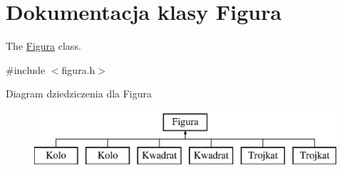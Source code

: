 \hypertarget{classFigura}{\section{Dokumentacja klasy Figura}
\label{classFigura}
}


The \hyperlink{classFigura}{Figura} class.  




{\ttfamily \#include $<$figura.\-h$>$}

Diagram dziedziczenia dla Figura\begin{figure}[H]
\begin{center}
\leavevmode
\includegraphics[height=2.000000cm]{classFigura}
\end{center}
\end{figure}
